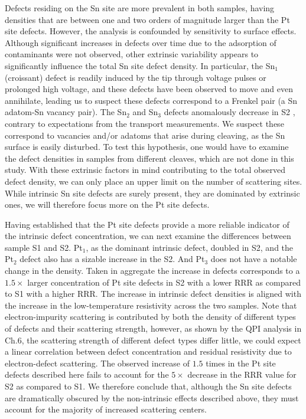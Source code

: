 \par Defects residing on the Sn site are more prevalent in both samples, having densities that are between one and two orders of magnitude larger than the Pt site defects. However, the analysis is confounded by sensitivity to surface effects. Although significant increases in defects over time due to the adsorption of contaminants were not observed, other extrinsic variability appears to significantly influence the total Sn site defect density. In particular, the Sn$_1$ (croissant) defect is readily induced by the tip through voltage pulses or prolonged high voltage, and these defects have been observed to move and even annihilate, leading us to suspect these defects correspond to a Frenkel pair (a Sn adatom-Sn vacancy pair). The Sn$_2$ and Sn$_3$ defects anomalously decrease in S2 , contrary to expectations from the transport measurements. We suspect these correspond to vacancies and/or adatoms that arise during cleaving, as the Sn surface is easily disturbed. To test this hypothesis, one would have to examine the defect densities in samples from different cleaves, which are not done in this study. With these extrinsic factors in mind contributing to the total observed defect density, we can only place an upper limit on the number of scattering sites. While intrinsic Sn site defects are surely present, they are dominated by extrinsic ones, we will therefore focus more on the Pt site defects.

\par Having established that the Pt site defects provide a more reliable indicator of the intrinsic defect concentration, we can next examine the differences between sample S1 and S2. Pt$_1$, as the dominant intrinsic defect, doubled in S2, and the Pt$_2$ defect also has a sizable increase in the S2. And Pt$_3$ does not have a notable change in the density. Taken in aggregate the increase in defects corresponds to a $1.5\times$ larger concentration of Pt site defects in S2 with a lower \ac{RRR} as compared to S1 with a higher \ac{RRR}.  The increase in intrinsic defect densities is aligned with the increase in the low-temperature resistivity across the two samples. 
Note that electron-impurity scattering is contributed by both the density of different types of defects and their scattering strength, however, as shown by the \ac{QPI} analysis in Ch.6, the scattering strength of different defect types differ little, we could expect a linear correlation between defect concentration and residual resistivity due to electron-defect scattering. The observed increase of $1.5$ times in the Pt site defects described here fails to account for the $5\times$ decrease in the \ac{RRR} value for S2 as compared to S1. We therefore conclude that, although the Sn site defects are dramatically obscured by the non-intrinsic effects described above, they must account for the majority of increased scattering centers. 



